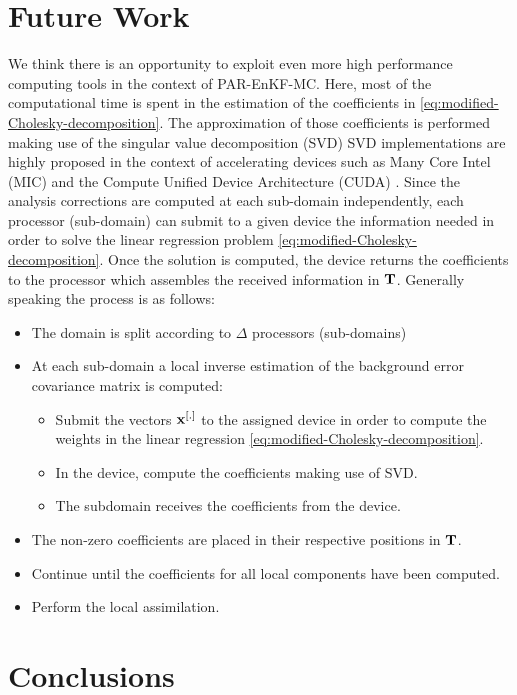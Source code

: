\documentclass[12pt]{article}
\newcommand{\T}{{\bf T}}
\begin{document}
\section{Future Work}
\label{sec:future-work}
We think there is an opportunity to exploit even more high performance computing tools in the context of PAR-EnKF-MC. Here, most of the computational time is spent in the estimation of the coefficients in \eqref{eq:modified-Cholesky-decomposition}. The approximation of those coefficients is performed making use of the singular value decomposition (SVD) SVD implementations are highly proposed in the context of accelerating devices such as Many Core Intel (MIC) \cite{Huang13042015} and the Compute Unified Device Architecture (CUDA) \cite{Lahbar5161058}. Since the analysis corrections are computed at each sub-domain independently, each processor (sub-domain) can submit to a given device the information needed in order to solve the linear regression problem \eqref{eq:modified-Cholesky-decomposition}. Once the solution is computed, the device returns the coefficients to the processor which assembles the received information in $\T$. Generally speaking the process is as follows:
\begin{itemize}
\item The domain is split according to $\Delta$ processors (sub-domains)
\item At each sub-domain a local inverse estimation of the background error covariance matrix is computed:
\begin{itemize}
\item Submit the vectors ${\bf x}^{[.]}$ to the assigned device in order to compute the weights in the linear regression \eqref{eq:modified-Cholesky-decomposition}.
\item In the device, compute the coefficients making use of SVD.
\item The subdomain receives the coefficients from the device.
\end{itemize}
\item The non-zero coefficients are placed in their respective positions in $\T$.
\item Continue until the coefficients for all local components have been computed.
\item Perform the local assimilation.
\end{itemize}

\section{Conclusions}
\label{sec:conclusions}
\end{document}

